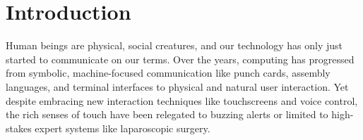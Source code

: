 
\chapter{Introduction}
\label{ch:introduction}
Human beings are physical, social creatures, and our technology has only just started to communicate on our terms.
Over the years, computing has progressed from symbolic, machine-focused communication like punch cards, assembly languages, and terminal interfaces to physical and natural user interaction.
Yet despite embracing new interaction techniques like touchscreens and voice control, the rich senses of touch have been relegated to buzzing alerts or limited to high-stakes expert systems like laparoscopic surgery.

